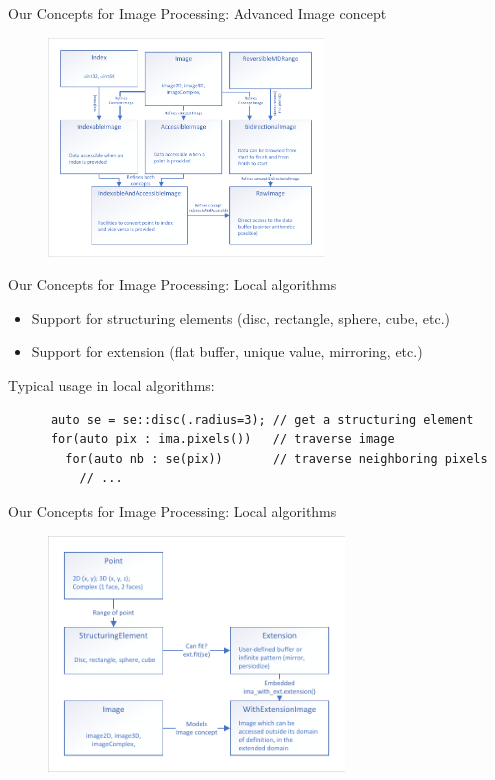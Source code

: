 \documentclass[12pt,aspectratio=169]{beamer}
\begin{document}
\begin{frame}[fragile]{Our Concepts for Image Processing: Advanced Image concept}
  \centering
  \begin{figure}
    \includegraphics[width=0.65\textwidth]{../figures/concepts/images_all}
  \end{figure}
\end{frame}


\begin{frame}[fragile]{Our Concepts for Image Processing: Local algorithms}
  \begin{itemize}
    \item Support for structuring elements (disc, rectangle, sphere, cube, etc.)
    \item Support for extension (flat buffer, unique value, mirroring, etc.)
  \end{itemize}
  Typical usage in local algorithms:

  \begin{verbatim}
      auto se = se::disc(.radius=3); // get a structuring element
      for(auto pix : ima.pixels())   // traverse image
        for(auto nb : se(pix))       // traverse neighboring pixels
          // ...
  \end{verbatim}
\end{frame}

\begin{frame}[fragile]{Our Concepts for Image Processing: Local algorithms}
  \centering
  \begin{figure}
    \includegraphics[width=0.7\textwidth]{../figures/concepts/se_extension}
  \end{figure}
\end{frame}
\end{document}
